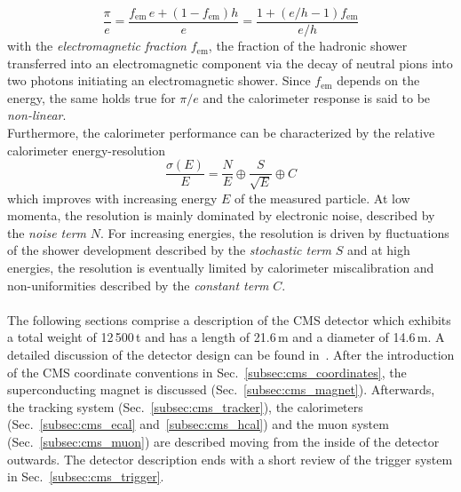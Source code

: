 \begin{equation}
\frac{\pi}{e} = \frac{f_\mathrm{em}\, e + (1 - f_\mathrm{em}) h}{e} = \frac{1+(e/h - 1) f_\mathrm{em}}{e/h}
\end{equation}
with the \textit{electromagnetic fraction} $f_\mathrm{em}$, \ie the fraction of the hadronic shower transferred into an electromagnetic component via the decay of neutral pions into two photons initiating an electromagnetic shower. Since $f_\mathrm{em}$ depends on the energy, the same holds true for $\pi/e$ and the calorimeter response is said to be \textit{non-linear}. \\
Furthermore, the calorimeter performance can be characterized by the relative calorimeter energy-resolution
\begin{equation}
\frac{\sigma(E)}{E}= \frac{N}{E} \oplus \frac{S}{\sqrt{E}} \oplus C 
\end{equation}
which improves with increasing energy $E$ of the measured particle. At low momenta, the resolution is mainly dominated by electronic noise, described by the \textit{noise term} $N$. For increasing energies, the resolution is driven by fluctuations of the shower development described by the \textit{stochastic term} $S$ and at high energies, the resolution is eventually limited by calorimeter miscalibration and non-uniformities described by the \textit{constant term} $C$.\\ 
\\ 
The following sections comprise a description of the CMS detector which exhibits a total weight of 12\,500\,t and has a length of 21.6\,m and a diameter of 14.6\,m. A detailed discussion of the detector design can be found in~\cite{Chatrchyan:2008zzk, bib:cmsptdr1}. After the introduction of the CMS coordinate conventions in Sec.~\ref{subsec:cms_coordinates}, the superconducting magnet is discussed (Sec.~\ref{subsec:cms_magnet}). Afterwards, the tracking system (Sec.~\ref{subsec:cms_tracker}), the calorimeters (Sec.~\ref{subsec:cms_ecal} and~\ref{subsec:cms_hcal}) and the muon system (Sec.~\ref{subsec:cms_muon}) are described moving from the inside of the detector outwards. The detector description ends with a short review of the trigger system in Sec.~\ref{subsec:cms_trigger}.  

